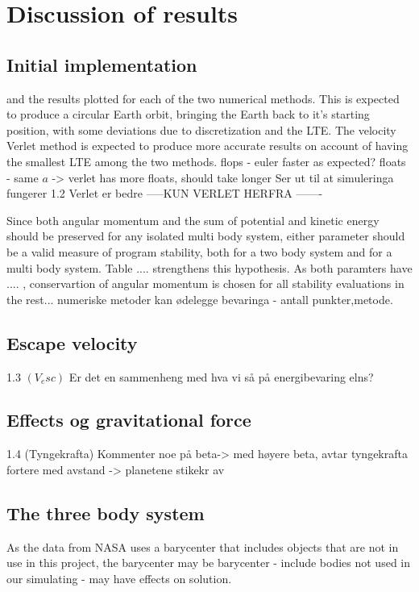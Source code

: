 \documentclass[%
oneside,                 %
final,                   %
10pt]{article}
\begin{document}
\section{Discussion of results}

\subsection{Initial implementation}
\label{subsec:Discofres:initimpl}

and the results plotted for each of the two numerical methods. This is expected to produce a circular Earth orbit, bringing the Earth back to it's starting position, with some deviations due to discretization and the LTE. The velocity Verlet method is expected to produce more accurate results on account of having the smallest LTE among the two methods.
flops - euler faster as expected?
floats - same $a$ -> verlet has more floats, should take longer
\label{subsec:Init_implm}
 Ser ut til at simuleringa fungerer
1.2 Verlet er bedre
 -----KUN VERLET HERFRA -------
 
Since both angular momentum and the sum of potential and kinetic energy should be preserved for any isolated multi body system, either parameter should be a valid measure of program stability, both for a two body system and for a multi body system. Table .... strengthens this hypothesis. As both paramters have .... , conservartion of angular momentum is chosen for all stability evaluations in the rest... numeriske metoder kan ødelegge bevaringa - antall punkter,metode.
 
 
\subsection{Escape velocity}
1.3 $(V_esc)$ Er det en sammenheng med hva vi så på energibevaring elns? 
\subsection{Effects og gravitational force}
1.4 (Tyngekrafta) Kommenter noe på beta-> med høyere beta, avtar tyngekrafta fortere med avstand -> planetene stikekr av

\subsection{The three body system}
\label{subsec:Discofres:3B}
As the data from NASA uses a barycenter that includes objects that are not in use in this project, the barycenter may be 
barycenter - include bodies not used in our simulating - may have effects on solution.
\end{document}
